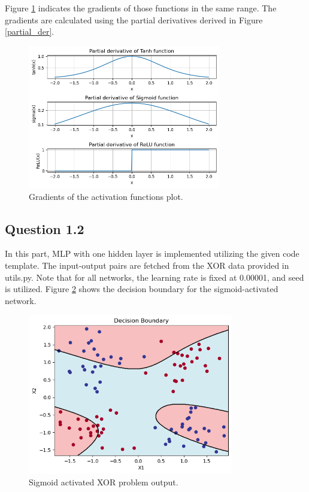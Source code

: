 \documentclass{assignment}
\begin{document}
Figure \ref{fig:activation_functions_gradient} indicates the gradients of those functions in the same range. The gradients are calculated using the partial derivatives derived in Figure \ref{partial_der}.

\begin{figure}[!htb]
    \centering
    \includegraphics[width=0.75\textwidth]{figures/q1_2.png}
    \caption{Gradients of the activation functions plot.}
    \label{fig:activation_functions_gradient}
\end{figure}



\subsection*{Question 1.2}

In this part, MLP with one hidden layer is implemented utilizing the given code template. The input-output pairs are fetched from the XOR data provided in utils.py. Note that for all networks, the learning rate is fixed at 0.00001, and seed is utilized. Figure \ref{fig:sigmoid_q1} shows the decision boundary for the sigmoid-activated network. 

\begin{figure}[!htb]
    \centering
    \includegraphics[width=0.8\textwidth]{figures/q1_sigmoid.png}
    \caption{Sigmoid activated XOR problem output.}
    \label{fig:sigmoid_q1}
\end{figure}
\end{document}
